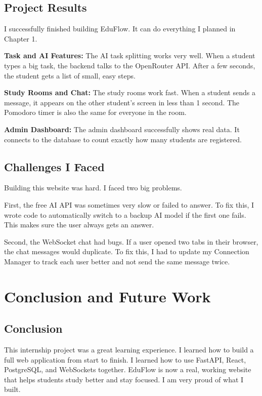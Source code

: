 \documentclass[12pt,a4paper]{report}
\begin{document}
\section{Project Results}
I successfully finished building EduFlow. It can do everything I planned in Chapter 1.

\textbf{Task and AI Features:} 
The AI task splitting works very well. When a student types a big task, the backend talks to the OpenRouter API. After a few seconds, the student gets a list of small, easy steps. 

\textbf{Study Rooms and Chat:}
The study rooms work fast. When a student sends a message, it appears on the other student's screen in less than 1 second. The Pomodoro timer is also the same for everyone in the room.

\textbf{Admin Dashboard:}
The admin dashboard successfully shows real data. It connects to the database to count exactly how many students are registered. 


\section{Challenges I Faced}
Building this website was hard. I faced two big problems.

First, the free AI API was sometimes very slow or failed to answer. To fix this, I wrote code to automatically switch to a backup AI model if the first one fails. This makes sure the user always gets an answer.

Second, the WebSocket chat had bugs. If a user opened two tabs in their browser, the chat messages would duplicate. To fix this, I had to update my Connection Manager to track each user better and not send the same message twice.

\chapter{Conclusion and Future Work}

\section{Conclusion}
This internship project was a great learning experience. I learned how to build a full web application from start to finish. I learned how to use FastAPI, React, PostgreSQL, and WebSockets together. EduFlow is now a real, working website that helps students study better and stay focused. I am very proud of what I built.
\end{document}
